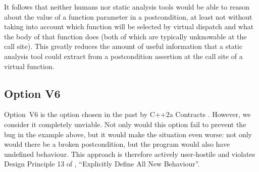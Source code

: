 It follows that neither humans nor static analysis tools would be able to reason about the value of a function parameter in a postcondition, at least not without taking into account which function will be selected by virtual dispatch and what the body of that function does (both of which are typically unknowable at the call site). This greatly reduces the amount of useful information that a static analysis tool could extract from a postcondition assertion at the call site of a virtual function.

\subsection*{Option V6}

Option~V6 is the option chosen in the past by C++2a Contracts \cite{P0542R5}. However, we consider it completely unviable. Not only would this option fail to prevent the bug in the example above, but it would make the situation even worse: not only would there be a broken postcondition, but the program would also have undefined behaviour. This approach is therefore actively user-hostile and violates Design Principle 13 of \cite{P2900R10}, ``Explicitly Define All New Behaviour''.

